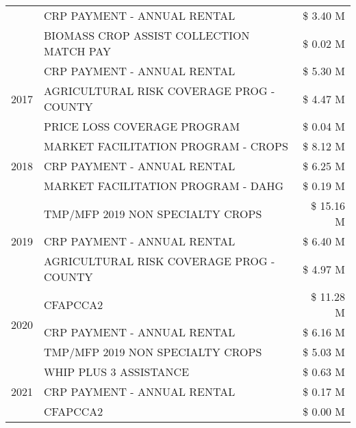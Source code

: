 \begin{tabular}{llr}
 & CRP PAYMENT - ANNUAL RENTAL & \$ 3.40 M \\
 & BIOMASS CROP ASSIST COLLECTION MATCH PAY & \$ 0.02 M \\
\cline{1-3}
\multirow[t]{3}{*}{2017} & CRP PAYMENT - ANNUAL RENTAL & \$ 5.30 M \\
 & AGRICULTURAL RISK COVERAGE PROG - COUNTY & \$ 4.47 M \\
 & PRICE LOSS COVERAGE PROGRAM & \$ 0.04 M \\
\cline{1-3}
\multirow[t]{3}{*}{2018} & MARKET FACILITATION PROGRAM - CROPS & \$ 8.12 M \\
 & CRP PAYMENT - ANNUAL RENTAL & \$ 6.25 M \\
 & MARKET FACILITATION PROGRAM - DAHG & \$ 0.19 M \\
\cline{1-3}
\multirow[t]{3}{*}{2019} & TMP/MFP 2019 NON SPECIALTY CROPS & \$ 15.16 M \\
 & CRP PAYMENT - ANNUAL RENTAL & \$ 6.40 M \\
 & AGRICULTURAL RISK COVERAGE PROG - COUNTY & \$ 4.97 M \\
\cline{1-3}
\multirow[t]{3}{*}{2020} & CFAPCCA2 & \$ 11.28 M \\
 & CRP PAYMENT - ANNUAL RENTAL & \$ 6.16 M \\
 & TMP/MFP 2019 NON SPECIALTY CROPS & \$ 5.03 M \\
\cline{1-3}
\multirow[t]{3}{*}{2021} & WHIP PLUS 3 ASSISTANCE & \$ 0.63 M \\
 & CRP PAYMENT - ANNUAL RENTAL & \$ 0.17 M \\
 & CFAPCCA2 & \$ 0.00 M \\
\cline{1-3}
\bottomrule
\end{tabular}
